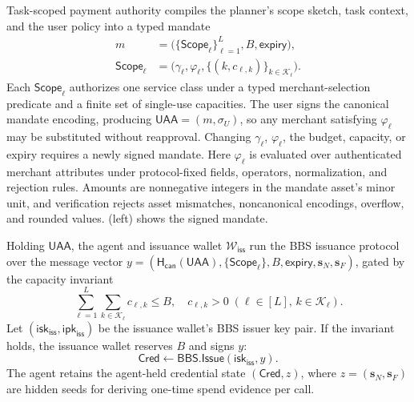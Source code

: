 \documentclass[letterpaper]{article}
\newcommand{\hash}{\mathsf{H}_{\mathsf{can}}}
\begin{document}
Task-scoped payment authority compiles the planner's scope sketch, task context, and the user
policy into a typed mandate
\begin{equation}
\begin{aligned}
m
  &=
  \bigl(
    \{\mathsf{Scope}_{\ell}\}_{\ell=1}^{L},
    B,
    \mathsf{expiry}
  \bigr),\\[2pt]
\mathsf{Scope}_{\ell}
  &=
  \bigl(
    \gamma_{\ell},
    \varphi_{\ell},
    \{(k,c_{\ell,k})\}_{k\in\mathcal{K}_{\ell}}
  \bigr).
\end{aligned}
\label{eq:mandate}
\end{equation}
Each \(\mathsf{Scope}_{\ell}\) authorizes one service class under a typed
merchant-selection predicate and a finite set of single-use capacities. The
user signs the canonical mandate encoding, producing
\(\mathsf{UAA}=(m,\sigma_U)\), so any merchant satisfying \(\varphi_\ell\) may
be substituted without reapproval. Changing \(\gamma_\ell\), \(\varphi_\ell\),
the budget, capacity, or expiry requires a newly signed mandate. Here
\(\varphi_\ell\) is evaluated over authenticated merchant attributes under
protocol-fixed fields, operators, normalization, and rejection rules. Amounts
are nonnegative integers in the mandate asset's minor unit, and verification
rejects asset mismatches, noncanonical encodings, overflow, and rounded values.
 (left) shows the signed mandate.

Holding \(\mathsf{UAA}\), the agent and issuance wallet \(\mathcal
W_{\mathsf{iss}}\) run the BBS issuance protocol over the message vector
\(y=(\hash(\mathsf{UAA}),\{\mathsf{Scope}_\ell\},B,\mathsf{expiry},
\mathbf{s}_N,\mathbf{s}_F)\),
gated by the capacity invariant
\begin{equation}
\sum_{\ell=1}^{L}\sum_{k\in\mathcal K_\ell}c_{\ell,k}\le B,\quad
c_{\ell,k}>0\;(\ell\in[L],\,k\in\mathcal K_\ell).
\label{eq:mint-ok}
\end{equation}
Let \((\mathsf{isk}_{\mathsf{iss}},\mathsf{ipk}_{\mathsf{iss}})\) be the
issuance wallet's BBS issuer key pair. If the invariant holds, the issuance
wallet reserves \(B\) and signs \(y\):
\begin{equation}
\mathsf{Cred}
\leftarrow
\mathsf{BBS.Issue}(\mathsf{isk}_{\mathsf{iss}},y).
\label{eq:bbs-issue}
\end{equation}
The agent retains the agent-held credential state \((\mathsf{Cred},z)\), where
\(z=(\mathbf{s}_N,\mathbf{s}_F)\) are hidden seeds for deriving one-time spend
evidence per call.
\end{document}
